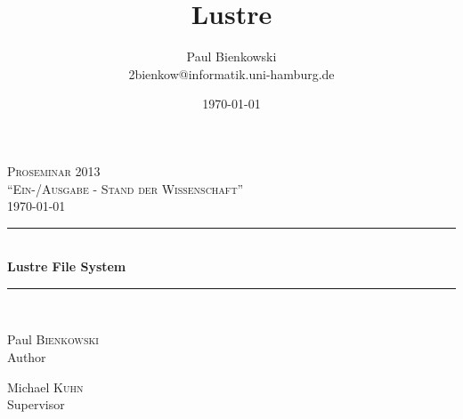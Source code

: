 \documentclass[a4paper,11pt,fleqn,oneside]{scrartcl}
\title{Lustre}
\author{Paul Bienkowski \\[0.2em] \scriptsize 2bienkow@informatik.uni-hamburg.de}
\date{\today}
\begin{document}

\begin{titlepage}
    \begin{center}
    \vspace*{\fill}

    \textsc{\Large Proseminar 2013}\\[0.0cm]
    \textsc{\small ``Ein-/Ausgabe - Stand der Wissenschaft''}\\[0.5cm]
    \textsc{\today}\\[0.5cm]

    \rule{0.8\textwidth}{0.4pt}
    \\[0.4cm]
    {\huge \bfseries Lustre File System}
    \\[0.0cm]
    \rule{0.8\textwidth}{0.4pt}\\[1.2cm]

    \begin{minipage}{0.4\textwidth}
        \begin{flushleft} \large
            Paul \textsc{Bienkowski}\\
            {\small Author}
        \end{flushleft}
    \end{minipage}
    \begin{minipage}{0.4\textwidth}
        \begin{flushright} \large
            Michael \textsc{Kuhn}\\
            {\small Supervisor}
        \end{flushright}
    \end{minipage}

    \vfill

    \end{center}
\end{titlepage}









\end{document}
